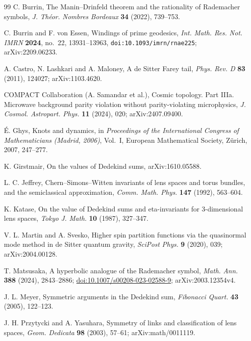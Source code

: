 \documentclass[11pt]{article}
\theoremstyle{definition}
\begin{document}
\begin{thebibliography}{99}
C. Burrin, The Manin--Drinfeld theorem and the rationality of Rademacher
symbols, \emph{J. Th\'eor. Nombres Bordeaux} \textbf{34} (2022), 739--753.

C. Burrin and F. von Essen, Windings of prime geodesics, \emph{Int.
Math. Res. Not. IMRN} \textbf{2024}, no.~22, 13931--13963,
\texttt{doi:10.1093/imrn/rnae225}; arXiv:2209.06233.

A. Castro, N. Lashkari and A. Maloney, A de Sitter Farey tail,
\emph{Phys. Rev. D} \textbf{83} (2011), 124027; arXiv:1103.4620.

COMPACT Collaboration (A. Samandar et al.), Cosmic topology. Part IIIa.
Microwave background parity violation without parity-violating
microphysics, \emph{J. Cosmol. Astropart. Phys.} \textbf{11} (2024), 020;
arXiv:2407.09400.

\'E. Ghys, Knots and dynamics, in \emph{Proceedings of the International
Congress of Mathematicians (Madrid, 2006)}, Vol.~I, European
Mathematical Society, Z\"urich, 2007, 247--277.

K. Girstmair, On the values of Dedekind sums, arXiv:1610.05588.

L. C. Jeffrey, Chern--Simons--Witten invariants of lens spaces and torus
bundles, and the semiclassical approximation, \emph{Comm. Math. Phys.}
\textbf{147} (1992), 563--604.

K. Katase, On the value of Dedekind sums and eta-invariants for
3-dimensional lens spaces, \emph{Tokyo J. Math.} \textbf{10} (1987),
327--347.

V. L. Martin and A. Svesko, Higher spin partition functions via the
quasinormal mode method in de Sitter quantum gravity, \emph{SciPost Phys.}
\textbf{9} (2020), 039; arXiv:2004.00128.

T. Matsusaka, A hyperbolic analogue of the Rademacher symbol,
\emph{Math. Ann.} \textbf{388} (2024), 2843--2886;
\href{https://doi.org/10.1007/s00208-023-02588-9}{doi:10.1007/s00208-023-02588-9};
arXiv:2003.12354v4.

J. L. Meyer, Symmetric arguments in the Dedekind sum, \emph{Fibonacci
Quart.} \textbf{43} (2005), 122--123.

J. H. Przytycki and A. Yasuhara, Symmetry of links and classification of
lens spaces, \emph{Geom. Dedicata} \textbf{98} (2003), 57--61;
arXiv:math/0011119.


\end{thebibliography}
\end{document}
